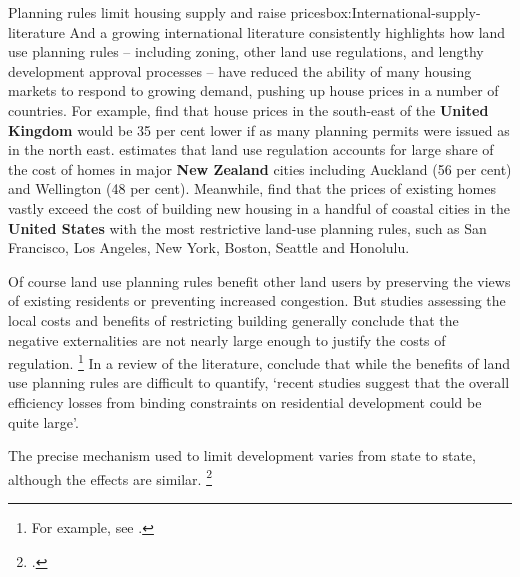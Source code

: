 \begin{bigbox}{Planning rules limit housing supply and raise prices}{box:International-supply-literature}
And a growing international literature consistently highlights how land use planning rules -- including zoning, other land use regulations, and lengthy development approval processes – have reduced the ability of many housing markets to respond to growing demand, pushing up house prices in a number of countries.
For example, \textcite{Hilber-Vermeulen-2015-Supply-constraints-effect-on-English-house-prices} find that house prices in the south-east of the \textbf{United Kingdom} would be 35 per cent lower if as many planning permits were issued as in the north east. \textcite{Lees2017LandRegulation} estimates that land use regulation accounts for large share of the cost of homes in major \textbf{New Zealand} cities including Auckland (56 per cent) and Wellington (48 per cent).  Meanwhile, \textcite{GlaeserGyourko2017EconImplications} find that the prices of existing homes vastly exceed the cost of building new housing in a handful of coastal cities in the \textbf{United States} with the most restrictive land-use planning rules, such as San Francisco, Los Angeles, New York, Boston, Seattle and Honolulu.

Of course land use planning rules benefit other land users by preserving the views of existing residents or preventing increased congestion. But studies assessing the local costs and benefits of restricting building generally conclude that the negative externalities are not nearly large enough to justify the costs of regulation.%
    \footnote{For example, see \textcites{Chesire-The-welfare-economics-of-land-use-planning}{Glaeser-Why-is-Manhattan-So-Expensive}{Turner-land-use-regulation-and-welfare}.}
In a review of the literature, \textcite{Gyourko-Molloy-Regulation-and-Housing-Supply} conclude that while the benefits of land use planning rules are difficult to quantify, `recent studies suggest that the overall efficiency losses from binding constraints on residential development could be quite large'.

\end{bigbox}

The precise mechanism used to limit development varies from state to state, although the effects are similar.%
    \footcites[][xxv]{PC2011PerformanceBenchmark}{HsiehEtAlSupply2012}

